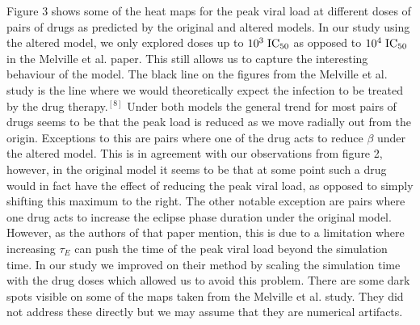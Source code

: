 \documentclass[a4paper,11pt]{article}
\begin{document}
Figure 3 shows some of the heat maps for the peak viral load at different doses of pairs of drugs as predicted by the original and altered models. In our study using the altered model, we only explored doses up to $10^3 \hspace{1mm} \mathrm{IC}_{50}$ as opposed to $10^4 \hspace{1mm} \mathrm{IC}_{50}$ in the Melville et al. paper. This still allows us to capture the interesting behaviour of the model. The black line on the figures from the Melville et al. study is the line where we would theoretically expect the infection to be treated by the drug therapy.$^{[8]}$  Under both models the general trend for most pairs of drugs seems to be that the peak load is reduced as we move radially out from the origin. Exceptions to this are pairs where one of the drug acts to reduce $\beta$ under the altered model. This is in agreement with our observations from figure 2, however, in the original model it seems to be that at some point such a drug would in fact have the effect of reducing the peak viral load, as opposed to simply shifting this maximum to the right. The other notable exception are pairs where one drug acts to increase the eclipse phase duration under the original model. However, as the authors of that paper mention, this is due to a limitation where increasing $\tau_E$ can push the time of the peak viral load beyond the simulation time. In our study we improved on their method by scaling the simulation time with the drug doses which allowed us to avoid this problem. There are some dark spots visible on some of the maps taken from the Melville et al. study. They did not address these directly but we may assume that they are numerical artifacts. 
\end{document}
